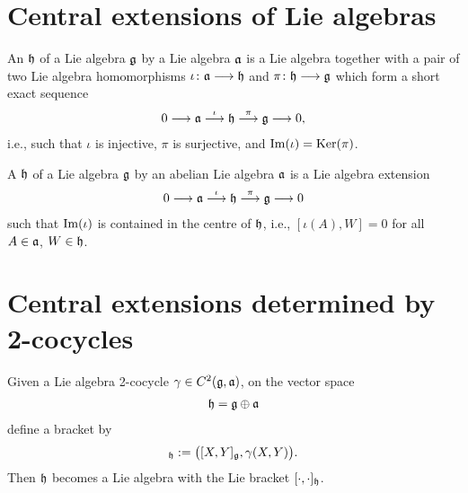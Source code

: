 \section{Central extensions of Lie algebras}

\begin{definition}
  \label{def:LieExtension}
  \leanok
  An  $\mathfrak{h}$ of a Lie algebra $\mathfrak{g}$ by a Lie algebra $\mathfrak{a}$ is
  a Lie algebra together with a pair of two Lie algebra homomorphisms
  $\iota \colon \mathfrak{a} \longrightarrow \mathfrak{h}$ and
  $\pi \colon \mathfrak{h} \longrightarrow \mathfrak{g}$ which form a
  short exact sequence
  \begin{align*}
    0 \longrightarrow \mathfrak{a}
      \overset{\iota}{\longrightarrow} \mathfrak{h}
      \overset{\pi}{\longrightarrow} \mathfrak{g}
      \longrightarrow 0 ,
  \end{align*}
  i.e., such that $\iota$ is injective, $\pi$ is surjective,
  and $\mathrm{Im} (\iota) = \mathrm{Ker} (\pi)$.
\end{definition}

\begin{definition}
  \label{def:LieCentralExtension}
  \leanok
  A  $\mathfrak{h}$ of a Lie algebra $\mathfrak{g}$ by an abelian Lie algebra $\mathfrak{a}$ is
  a Lie algebra extension
  \begin{align*}
    0 \longrightarrow \mathfrak{a}
      \overset{\iota}{\longrightarrow} \mathfrak{h}
      \overset{\pi}{\longrightarrow} \mathfrak{g}
      \longrightarrow 0
  \end{align*}
  such that $\mathrm{Im} (\iota)$ is contained in the centre of $\mathfrak{h}$,
  i.e., $[\iota(A), W] = 0$ for all $A \in \mathfrak{a}$, $W \in \mathfrak{h}$.
\end{definition}



\section{Central extensions determined by 2-cocycles}

\begin{definition}
  \label{def:CentralExtensionOfCocycle}
  \leanok
  Given a Lie algebra 2-cocycle $\gamma \in C^2(\mathfrak{g},\mathfrak{a})$,
  on the vector space
  \begin{align*}
    \mathfrak{h} = \mathfrak{g} \oplus \mathfrak{a}
  \end{align*}
  define a bracket by
  \begin{align*}
    [(X, A), (Y, B)]_{\egLie} := \big([X, Y]_{\gLie}, \gamma(X, Y) \big) .
  \end{align*}
  Then $\mathfrak{h}$ becomes a Lie algebra with the Lie bracket
  $[\cdot,\cdot]_{\mathfrak{h}}$.
\end{definition}

